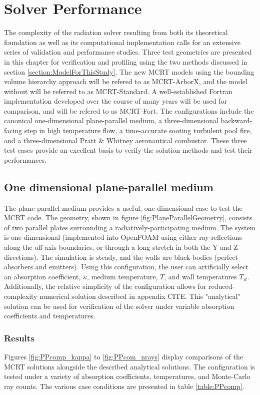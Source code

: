 \addchapheadtotoc
\chapter{Solver Performance}\label{chapter:Example}
The complexity of the radiation solver resulting from both its theoretical foundation as well as its computational implementation calls for an extensive series of validation and performance studies.
Three test geometries are presented in this chapter for verification and profiling using the two methods discussed in section \ref{section:ModelForThisStudy}. The new MCRT models using the bounding volume hierarchy approach will be refered to as MCRT-ArborX, and the model without will be referred to as MCRT-Standard. 
A well-established Fortran implementation developed over the course of many years will be used for comparison, and will be refered to as MCRT-Fort.
The configurations include the canonical one-dimensional plane-parallel medium, a three-dimensional backward-facing step in high temperature flow, a time-accurate sooting turbulent pool fire, and a three-dimensional Pratt \& Whitney aeronautical combustor. 
These three test cases provide an excellent basis to verify the solution methods and test their performances. 



\section{One dimensional plane-parallel medium}
The plane-parallel medium provides a useful, one dimensional case to test the MCRT code. The geometry, shown in figure \ref{fig:PlaneParallelGeometry}, consists of two parallel plates surrounding a radiatively-participating medium. 
The system is one-dimensional (implemented into OpenFOAM using either ray-reflections along the off-axis boundaries, or through a long stretch in both the Y and Z directions). The simulation is steady, and the walls are black-bodies (perfect absorbers and emitters).
Using this configuration, the user can artificially select an absorption coefficient, $\kappa{}$, medium temperature, $T$, and wall temperatures $T_w$.
Additionally, the relative simplicity of the configuration allows for reduced-complexity numerical solution described in appendix CITE. 
This "analytical" solution can be used for verification of the solver under variable absorption coefficients and temperatures.

\subsection{Results}
Figures \ref{fig:PPcomp_kappa} to \ref{fig:PPcom_nrays} display comparisons of the MCRT solutions alongside the described analytical solutions. The configuration is tested under a variety of absorption coefficients, temperatures, and Monte-Carlo ray counts. The various case conditions are presented in table \ref{table:PPcomp}.

